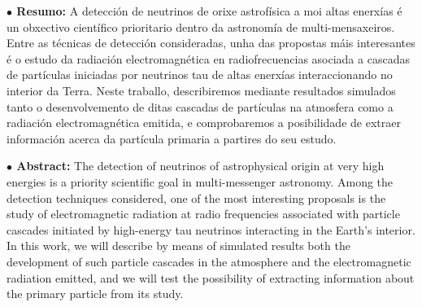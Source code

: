 \documentclass[12 pt, a4paper]{article} %
\numberwithin{equation}{section}
\numberwithin{figure}{section}
\numberwithin{table}{section}
\begin{document}
	\begin{flushleft}  {\bf $\bullet$ Resumo:\;\;}
		A detección de neutrinos de orixe astrofísica a moi altas enerxías é un obxectivo científico prioritario dentro da astronomía de multi-mensaxeiros. Entre as técnicas de detección consideradas, unha das propostas máis interesantes é o estudo da radiación electromagnética en radiofrecuencias asociada a cascadas de partículas iniciadas por neutrinos tau de altas enerxías interaccionando no interior da Terra. Neste traballo, describiremos mediante resultados simulados tanto o desenvolvemento de ditas cascadas de partículas na atmosfera como a radiación electromagnética emitida, e comprobaremos a posibilidade de extraer información acerca da partícula primaria a partires do seu estudo.
	\end{flushleft}\mbox{}
	
	
	\begin{flushleft}  {\bf $\bullet$ Abstract:\;\;}
		The detection of neutrinos of astrophysical origin at very high energies is a priority scientific goal in multi-messenger astronomy. Among the detection techniques considered, one of the most interesting proposals is the study of electromagnetic radiation at radio frequencies associated with particle cascades initiated by high-energy tau neutrinos interacting in the Earth's interior. In this work, we will describe by means of simulated results both the development of such particle cascades in the atmosphere and the electromagnetic radiation emitted, and we will test the possibility of extracting information about the primary particle from its study.
	\end{flushleft}\mbox{}
	
	\clearpage
	\pagestyle{fancy}
	\fancyhead{}
	\lhead{}
	\rhead{}
	\chead{}
	\renewcommand{\headrulewidth}{0.1pt}
	\lfoot{} 
	\cfoot{\thepage}
	\rfoot{} 
	\renewcommand{\footrulewidth}{0pt}
	
	\setcounter{page}{1}
	\tableofcontents
	\clearpage
	
\end{document}
